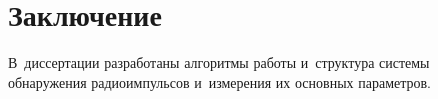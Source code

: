 \section{Заключение}

В~диссертации разработаны алгоритмы работы и~структура системы обнаружения радиоимпульсов и~измерения их основных параметров. 
